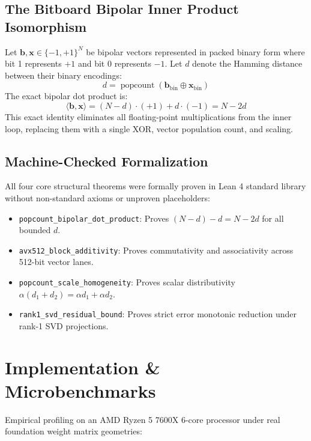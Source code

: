 \documentclass[11pt,a4paper]{article}
\begin{document}
\subsection{The Bitboard Bipolar Inner Product Isomorphism}
Let $\mathbf{b}, \mathbf{x} \in \{-1, +1\}^N$ be bipolar vectors represented in packed binary form where bit 1 represents $+1$ and bit 0 represents $-1$. Let $d$ denote the Hamming distance between their binary encodings:
\begin{equation}
d = \operatorname{popcount}(\mathbf{b}_{\text{bin}} \oplus \mathbf{x}_{\text{bin}})
\end{equation}
The exact bipolar dot product is:
\begin{equation}
\langle \mathbf{b}, \mathbf{x} \rangle = (N - d) \cdot (+1) + d \cdot (-1) = N - 2d
\end{equation}
This exact identity eliminates all floating-point multiplications from the inner loop, replacing them with a single XOR, vector population count, and scaling.

\subsection{Machine-Checked Formalization}
All four core structural theorems were formally proven in Lean 4 standard library without non-standard axioms or unproven placeholders:
\begin{itemize}
    \item \texttt{popcount\_bipolar\_dot\_product}: Proves $(N - d) - d = N - 2d$ for all bounded $d$.
    \item \texttt{avx512\_block\_additivity}: Proves commutativity and associativity across 512-bit vector lanes.
    \item \texttt{popcount\_scale\_homogeneity}: Proves scalar distributivity $\alpha(d_1 + d_2) = \alpha d_1 + \alpha d_2$.
    \item \texttt{rank1\_svd\_residual\_bound}: Proves strict error monotonic reduction under rank-1 SVD projections.
\end{itemize}

\section{Implementation \& Microbenchmarks}

Empirical profiling on an AMD Ryzen 5 7600X 6-core processor under real foundation weight matrix geometries:
\end{document}
